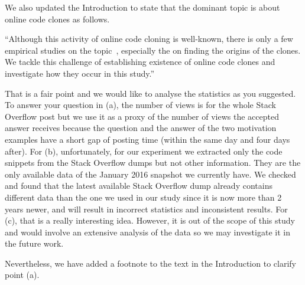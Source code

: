 \documentclass[a4paper,twoside,10pt]{reviewresponse}
\begin{document}
We also updated the Introduction to state that the dominant topic is about online code clones as follows.

``Although this activity of online code cloning is well-known, there is only a few
empirical studies on the topic~\citep{An2017,Abdalkareem2017,Baltes2017}, especially
the on finding the origins of the clones.
We tackle this challenge of establishing existence of online code clones and
investigate how they occur in this study.''


That is a fair point and we would like to analyse the statistics as you suggested. 
To answer your question in (a), the number of views
is for the whole Stack Overflow post but we use it as a proxy of the number of views the accepted answer receives
because the question and the answer of the two motivation examples have a short gap of posting time (within the same day and four days after).
For (b), unfortunately, for our experiment we extracted only the code snippets from the Stack Overflow dumps but not other information. They are the only available data of the January 2016 snapshot we currently have. We checked and found that the latest available Stack Overflow dump already contains different data than the one we used in our study since it is now more than 2 years newer, and will result in incorrect statistics and inconsistent results.
For (c), that is a really interesting idea. However, it is out of the scope of this study and would involve an extensive analysis of the data so we may investigate it in the future work.

 Nevertheless, we have added a footnote to the text in the Introduction to clarify point (a).
\end{document}
